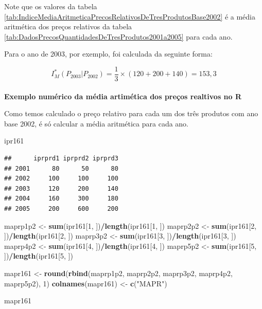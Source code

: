 \documentclass[
]{book}
\newenvironment{Shaded}{\begin{snugshade}}{\end{snugshade}}
\newcommand{\DecValTok}[1]{\textcolor[rgb]{0.00,0.00,0.81}{#1}}
\newcommand{\KeywordTok}[1]{\textcolor[rgb]{0.13,0.29,0.53}{\textbf{#1}}}
\newcommand{\NormalTok}[1]{#1}
\newcommand{\OperatorTok}[1]{\textcolor[rgb]{0.81,0.36,0.00}{\textbf{#1}}}
\newcommand{\StringTok}[1]{\textcolor[rgb]{0.31,0.60,0.02}{#1}}
\begin{document}
Note que os valores da tabela \ref{tab:IndiceMediaAritmeticaPrecosRelativosDeTresProdutosBase2002} é a média aritmética dos preços relativos da tabela \ref{tab:DadosPrecosQuantidadesDeTresProdutos2001a2005} para cada ano.

Para o ano de 2003, por exemplo, foi calculada da seguinte forma:

\[
I_M^{*}(P_{2003}|P_{2002}) = \dfrac{1}{3}\times \left( 120 + 200 +140 \right) = 153,3
\]\\
\textbf{Exemplo numérico da média artimética dos preços realtivos no R}

Como temos calculado o preço relativo para cada um dos três produtos com ano
base 2002, é só calcular a média aritmética para cada ano.

\begin{Shaded}
\begin{Highlighting}[]
\NormalTok{ipr161}
\end{Highlighting}
\end{Shaded}

\begin{verbatim}
##      iprprd1 iprprd2 iprprd3
## 2001      80      50      80
## 2002     100     100     100
## 2003     120     200     140
## 2004     160     300     180
## 2005     200     600     200
\end{verbatim}

\begin{Shaded}
\begin{Highlighting}[]
\NormalTok{maprp1p2 <-}\StringTok{ }\KeywordTok{sum}\NormalTok{(ipr161[}\DecValTok{1}\NormalTok{, ])}\OperatorTok{/}\KeywordTok{length}\NormalTok{(ipr161[}\DecValTok{1}\NormalTok{, ])}
\NormalTok{maprp2p2 <-}\StringTok{ }\KeywordTok{sum}\NormalTok{(ipr161[}\DecValTok{2}\NormalTok{, ])}\OperatorTok{/}\KeywordTok{length}\NormalTok{(ipr161[}\DecValTok{2}\NormalTok{, ])}
\NormalTok{maprp3p2 <-}\StringTok{ }\KeywordTok{sum}\NormalTok{(ipr161[}\DecValTok{3}\NormalTok{, ])}\OperatorTok{/}\KeywordTok{length}\NormalTok{(ipr161[}\DecValTok{3}\NormalTok{, ])}
\NormalTok{maprp4p2 <-}\StringTok{ }\KeywordTok{sum}\NormalTok{(ipr161[}\DecValTok{4}\NormalTok{, ])}\OperatorTok{/}\KeywordTok{length}\NormalTok{(ipr161[}\DecValTok{4}\NormalTok{, ])}
\NormalTok{maprp5p2 <-}\StringTok{ }\KeywordTok{sum}\NormalTok{(ipr161[}\DecValTok{5}\NormalTok{, ])}\OperatorTok{/}\KeywordTok{length}\NormalTok{(ipr161[}\DecValTok{5}\NormalTok{, ])}

\NormalTok{mapr161 <-}\StringTok{ }\KeywordTok{round}\NormalTok{(}\KeywordTok{rbind}\NormalTok{(maprp1p2, maprp2p2, maprp3p2, }
\NormalTok{    maprp4p2, maprp5p2), }\DecValTok{1}\NormalTok{)}
\KeywordTok{colnames}\NormalTok{(mapr161) <-}\StringTok{ }\KeywordTok{c}\NormalTok{(}\StringTok{"MAPR"}\NormalTok{)}

\NormalTok{mapr161}
\end{Highlighting}
\end{Shaded}
\end{document}
